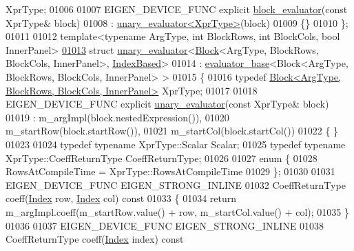 \begin{DoxyCode}
      XprType;
01006 
01007   EIGEN\_DEVICE\_FUNC \textcolor{keyword}{explicit} \hyperlink{struct_eigen_1_1internal_1_1block__evaluator}{block\_evaluator}(\textcolor{keyword}{const} XprType& block)
01008     : \hyperlink{struct_eigen_1_1internal_1_1unary__evaluator}{unary\_evaluator<XprType>}(block) 
01009   \{\}
01010 \};
01011 
01012 \textcolor{keyword}{template}<\textcolor{keyword}{typename} ArgType, \textcolor{keywordtype}{int} BlockRows, \textcolor{keywordtype}{int} BlockCols, \textcolor{keywordtype}{bool} InnerPanel>
\hyperlink{struct_eigen_1_1internal_1_1unary__evaluator_3_01_block_3_01_arg_type_00_01_block_rows_00_01_blo4d5c305426f8b1ea1436bf5cefc2693d}{01013} \textcolor{keyword}{struct }\hyperlink{struct_eigen_1_1internal_1_1unary__evaluator}{unary\_evaluator}<\hyperlink{group___core___module_class_eigen_1_1_block}{Block}<ArgType, BlockRows, BlockCols, InnerPanel>, 
      \hyperlink{struct_eigen_1_1internal_1_1_index_based}{IndexBased}>
01014   : \hyperlink{struct_eigen_1_1internal_1_1evaluator__base}{evaluator\_base}<Block<ArgType, BlockRows, BlockCols, InnerPanel> >
01015 \{
01016   \textcolor{keyword}{typedef} \hyperlink{group___core___module_class_eigen_1_1_block}{Block<ArgType, BlockRows, BlockCols, InnerPanel>} 
      XprType;
01017 
01018   EIGEN\_DEVICE\_FUNC \textcolor{keyword}{explicit} \hyperlink{struct_eigen_1_1internal_1_1unary__evaluator}{unary\_evaluator}(\textcolor{keyword}{const} XprType& block)
01019     : m\_argImpl(block.nestedExpression()), 
01020       m\_startRow(block.startRow()), 
01021       m\_startCol(block.startCol()) 
01022   \{ \}
01023  
01024   \textcolor{keyword}{typedef} \textcolor{keyword}{typename} XprType::Scalar Scalar;
01025   \textcolor{keyword}{typedef} \textcolor{keyword}{typename} XprType::CoeffReturnType CoeffReturnType;
01026 
01027   \textcolor{keyword}{enum} \{
01028     RowsAtCompileTime = XprType::RowsAtCompileTime
01029   \};
01030  
01031   EIGEN\_DEVICE\_FUNC EIGEN\_STRONG\_INLINE
01032   CoeffReturnType coeff(\hyperlink{namespace_eigen_a62e77e0933482dafde8fe197d9a2cfde}{Index} row, \hyperlink{namespace_eigen_a62e77e0933482dafde8fe197d9a2cfde}{Index} col)\textcolor{keyword}{ const}
01033 \textcolor{keyword}{  }\{ 
01034     \textcolor{keywordflow}{return} m\_argImpl.coeff(m\_startRow.value() + row, m\_startCol.value() + col); 
01035   \}
01036   
01037   EIGEN\_DEVICE\_FUNC EIGEN\_STRONG\_INLINE
01038   CoeffReturnType coeff(\hyperlink{namespace_eigen_a62e77e0933482dafde8fe197d9a2cfde}{Index} index)\textcolor{keyword}{ const}

\end{DoxyCode}
